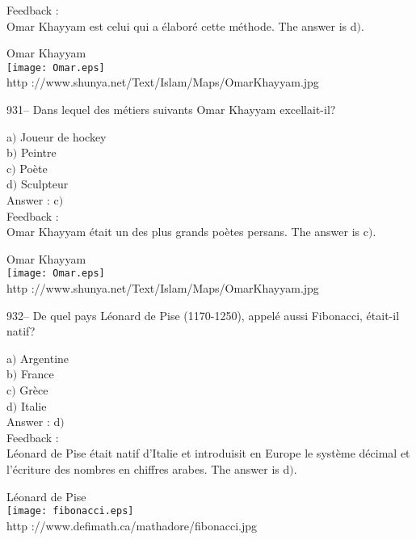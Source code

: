 \documentclass[letterpaper, 12pt]{article}
\begin{document}
Feedback :\\
Omar Khayyam est celui qui a \'elabor\'e cette m\'ethode. The answer is
d$)$.\\

        \begin{center}
        Omar Khayyam\\
    \texttt{[image: Omar.eps]}\\
        {\footnotesize http
://www.shunya.net/Text/Islam/Maps/OmarKhayyam.jpg}
    \end{center}

931-- Dans lequel des m\'etiers suivants Omar Khayyam excellait-il?

a$)$ Joueur de hockey \\
b$)$ Peintre \\
c$)$ Po\`ete \\
d$)$ Sculpteur \\

Answer : c$)$\\

Feedback : \\
Omar Khayyam \'etait un des plus grands po\`etes persans. The answer is
c$)$.\\

        \begin{center}
        Omar Khayyam\\
    \texttt{[image: Omar.eps]}\\
        {\footnotesize http
://www.shunya.net/Text/Islam/Maps/OmarKhayyam.jpg}
    \end{center}

932-- De quel pays L\'eonard de Pise (1170-1250), appel\'e aussi
Fibonacci, \'etait-il natif?

a$)$ Argentine \\
b$)$ France  \\
c$)$ Gr\`ece  \\
d$)$ Italie \\

Answer : d$)$\\

Feedback : \\
L\'eonard de Pise \'etait natif d'Italie et introduisit en Europe le
syst\`eme d\'ecimal et l'\'ecriture
des nombres en chiffres arabes. The answer is d$)$.\\

        \begin{center}
        L\'eonard de Pise\\
    \texttt{[image: fibonacci.eps]}\\
        {\footnotesize http ://www.defimath.ca/mathadore/fibonacci.jpg}
    \end{center}
\end{document}

